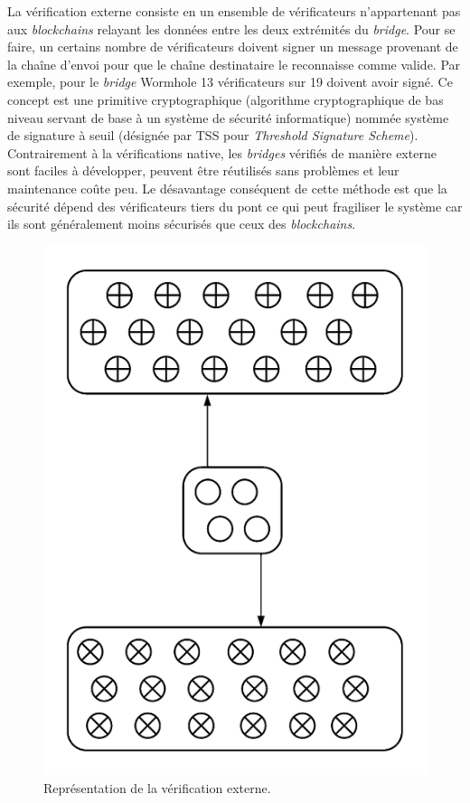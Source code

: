 \pagebreak

La vérification externe consiste en un ensemble de vérificateurs n’appartenant pas aux \textit{\gls{blockchain}s} relayant les données entre les deux extrémités du \textit{bridge}. Pour se faire, un certains nombre de vérificateurs doivent signer un message provenant de la chaîne d’envoi pour que le chaîne destinataire le reconnaisse comme valide. Par exemple, pour le \textit{bridge} Wormhole 13 vérificateurs sur 19 doivent avoir signé\cite{NomadDocsExternal}. Ce concept est une primitive cryptographique (algorithme cryptographique de bas niveau servant de base à un système de sécurité informatique) nommée système de signature à seuil (désignée par TSS pour \textit{Threshold Signature Scheme})\cite{BinanceTSS}. 
Contrairement à la vérifications native, les \textit{bridges} vérifiés de manière externe sont faciles à développer, peuvent être réutilisés sans problèmes et leur maintenance coûte peu. Le désavantage conséquent de cette méthode est que la sécurité dépend des vérificateurs tiers du pont ce qui peut fragiliser le système car ils sont généralement moins sécurisés que ceux des \textit{\gls{blockchain}s}. \\
\begin{figure}[h!]
    \centering
    \includegraphics[scale=0.50]{centralisation/imagesBridges/DiagrammeVerifExterne.png}
    \caption{Représentation de la vérification externe.}
    \label{fig:ExternalVerif}
\end{figure}

